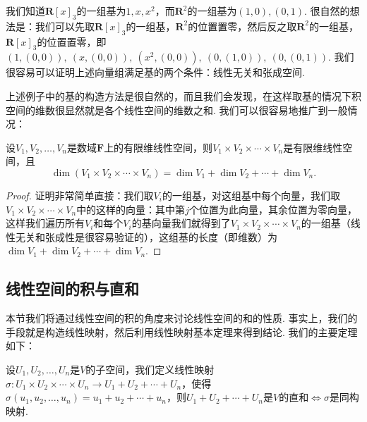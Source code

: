 \begin{solution}
    我们知道$\mathbf{R}[x]_3$的一组基为$1,x,x^2$，而$\mathbf{R}^2$的一组基为$(1,0),(0,1)$. 很自然的想法是：我们可以先取$\mathbf{R}[x]_3$的一组基，$\mathbf{R}^2$的位置置零，然后反之取$\mathbf{R}^2$的一组基，$\mathbf{R}[x]_3$的位置置零，即$(1,(0,0)),\ (x,(0,0)),\ (x^2,(0,0)),\ (0,(1,0)),\ (0,(0,1))$. 我们很容易可以证明上述向量组满足基的两个条件：线性无关和张成空间.
\end{solution}

上述例子中的基的构造方法是很自然的，而且我们会发现，在这样取基的情况下积空间的维数很显然就是各个线性空间的维数之和. 我们可以很容易地推广到一般情况：
\begin{theorem}\label{thm:5:积空间维数}
    设$V_1,V_2,\ldots,V_n$是数域$\mathbf{F}$上的有限维线性空间，则$V_1 \times V_2 \times \cdots \times V_n$是有限维线性空间，且
    \[\dim(V_1 \times V_2 \times \cdots \times V_n)=\dim V_1+\dim V_2+\cdots+\dim V_n.\]
\end{theorem}

\begin{proof}
    证明非常简单直接：我们取$V_i$的一组基，对这组基中每个向量，我们取$V_1 \times V_2 \times \cdots \times V_n$中的这样的向量：其中第$j$个位置为此向量，其余位置为零向量，这样我们遍历所有$V_i$和每个$V_i$的基向量我们就得到了$V_1 \times V_2 \times \cdots \times V_n$的一组基（线性无关和张成性是很容易验证的），这组基的长度（即维数）为$\dim V_1+\dim V_2+\cdots+\dim V_n$.
\end{proof}

\subsection{线性空间的积与直和}

本节我们将通过线性空间的积的角度来讨论线性空间的和的性质. 事实上，我们的手段就是构造线性映射，然后利用线性映射基本定理来得到结论. 我们的主要定理如下：
\begin{theorem} \label{thm:5:积与直和}
    设$U_1,U_2,\ldots,U_n$是$V$的子空间，我们定义线性映射$\sigma:U_1 \times U_2 \times \cdots \times U_n \to U_1+U_2+\cdots+U_n$，使得$\sigma(u_1,u_2,\ldots,u_n)=u_1+u_2+\cdots+u_n$，则$U_1+U_2+\cdots+U_n$是$V$的直和$\iff \sigma$是同构映射.
\end{theorem}

